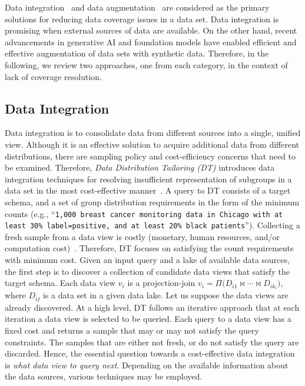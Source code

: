 \documentclass[11pt]{article}
\begin{document}
Data integration~\cite{nargesian2021tailoring,nargesian2022responsible} and data augmentation~\cite{sharma2020data,DBLP:journals/jair/ChawlaBHK02,iosifidis2018dealing,celis2020data} are considered as the primary solutions for reducing data coverage issues in a data set. 
Data integration is promising when external sources of data are available. On the other hand, recent advancements in generative AI and foundation models have enabled efficient and effective augmentation of data sets with synthetic data. 
Therefore, in the following, we review two approaches, one from each category, in the context of lack of coverage resolution.

\subsection{Data Integration}\label{sec:resolution:integration}

Data integration is to consolidate data from different sources into a single, unified view. 
Although it is an effective solution to acquire additional data from different distributions,
there are sampling policy and cost-efficiency concerns that need to be examined.  
Therefore, {\it Data Distribution Tailoring ({\sc DT})} introduces data integration techniques for resolving insufficient representation of subgroups in a data set in the most cost-effective manner~\cite{nargesian2021tailoring}.
A query to {\sc DT} 
consists of a target schema, and a set of group distribution requirements in the form of the minimum counts (e.g., ``{\tt\small 1,000 breast cancer monitoring data in Chicago with at least 30\% label=positive, and at least 20\% black patients}''). 
Collecting a fresh sample from a data view is costly (monetary, human resources, and/or computation cost)~\cite{asudeh2022towards}.
Therefore, {\sc DT} focuses on satisfying the count requirements with minimum cost. 
Given an input query and a lake of available data sources, the first step is to discover a collection of candidate data views that satisfy the target schema.
Each data view $v_i$ is a projection-join $v_i = \Pi\big(D_{i1}\bowtie\cdots\bowtie D_{ik_i} \big)$, where $D_{ij}$ is a data set in a given data lake.
Let us suppose the data views are already discovered.
At a high level, {\sc DT} follows an iterative approach that at each iteration a data view is selected to be queried.
Each query to a data view has a fixed cost and returns a sample that may or may not satisfy the query constraints.
The samples that are either not fresh, or do not satisfy the query are discarded.
Hence, the essential question towards a cost-effective data integration is {\it what data view to query next}.
Depending on the available information about the data sources, various techniques may be employed. 
\end{document}
